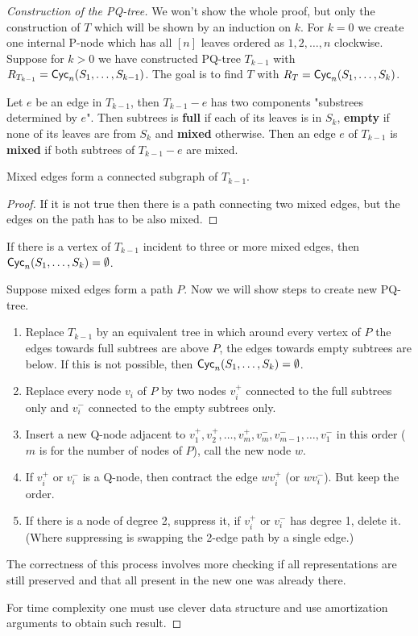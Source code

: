 \begin{proof}[Construction of the PQ-tree]
	We won't show the whole proof, but only the construction of $T$ which will be shown by an induction on $k$. For $k=0$ we create one internal P-node which has all $[n]$ leaves ordered as $1,2, \dots, n$ clockwise. Suppose for $k > 0$ we have constructed PQ-tree $T_{k-1}$ with $R_{T_{k-1}} = \textsf{Cyc}_{n}(S_1, \dots, S_{k-1})$. The goal is to find $T$ with $R_T = \textsf{Cyc}_{n}(S_1, \dots, S_k)$.
	
	Let $e$ be an edge in $T_{k-1}$, then $T_{k-1}-e$ has two components "substrees determined by $e$". Then subtrees is \textbf{full} if each of its leaves is in $S_k$, \textbf{empty} if none of its leaves are from $S_k$ and \textbf{mixed} otherwise. Then an edge $e$ of $T_{k-1}$ is \textbf{mixed} if both subtrees of $T_{k-1}-e$ are mixed.
	
	\begin{observ}
		Mixed edges form a connected subgraph of $T_{k-1}$.
	\end{observ}
	
	\begin{proof}
		If it is not true then there is a path connecting two mixed edges, but the edges on the path has to be also mixed.
	\end{proof}
	
	\begin{observ}
		If there is a vertex of $T_{k-1}$ incident to three or more mixed edges, then $\textsf{Cyc}_{n}(S_1, \dots, S_k) = \emptyset$.
	\end{observ}
	
	Suppose mixed edges form a path $P$. Now we will show steps to create new PQ-tree.
	
	\begin{enumerate}
		\item Replace $T_{k-1}$ by an equivalent tree in which around every vertex of $P$ the edges towards full subtrees are above $P$, the edges towards empty subtrees are below. If this is not possible, then $\textsf{Cyc}_{n}(S_1, \dots, S_k) = \emptyset$.
		\item Replace every node $v_i$ of $P$ by two nodes $v_i^+$ connected to the full subtrees only and $v_i^-$ connected to the empty subtrees only.
		\item Insert a new Q-node adjacent to $v_1^+, v_2^+, \dots, v_m^+, v_m^-, v_{m-1}^-, \dots, v_1^-$ in this order ($m$ is for the number of nodes of $P$), call the new node $w$.
		\item If $v_i^+$ or $v_i^-$ is a Q-node, then contract the edge $w v_i^+$ (or $w v_i^-$). But keep the order.
		\item If there is a node of degree 2, suppress it, if $v_i^+$ or $v_i^-$ has degree 1, delete it. (Where suppressing is swapping the 2-edge path by a single edge.) 
	\end{enumerate}
	
	The correctness of this process involves more checking if all representations are still preserved and that all present in the new one was already there.
	
	For time complexity one must use clever data structure and use amortization arguments to obtain such result.
\end{proof}

